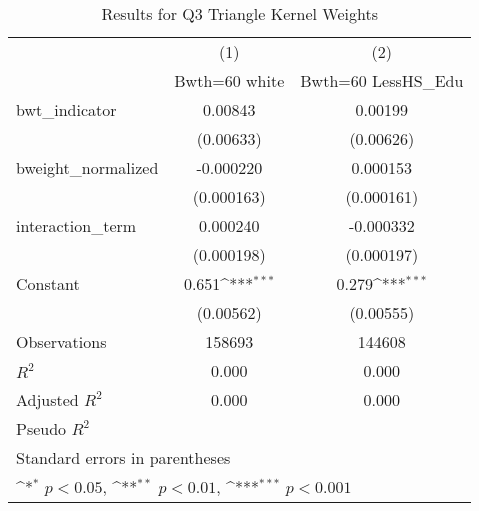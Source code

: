 \documentclass{article}
\begin{document}
\begin{table}[H]\centering
\def\sym#1{\ifmmode^{#1}\else\(^{#1}\)\fi}
\caption{Results for Q3 Triangle Kernel Weights \label{q3tri}}
\begin{tabular}{l*{2}{c}}
\toprule
                    &\multicolumn{1}{c}{(1)}&\multicolumn{1}{c}{(2)}\\
                    &\multicolumn{1}{c}{Bwth=60 white}&\multicolumn{1}{c}{Bwth=60 LessHS\_Edu}\\
\midrule
bwt\_indicator       &     0.00843         &     0.00199         \\
                    &   (0.00633)         &   (0.00626)         \\
\addlinespace
bweight\_normalized  &   -0.000220         &    0.000153         \\
                    &  (0.000163)         &  (0.000161)         \\
\addlinespace
interaction\_term    &    0.000240         &   -0.000332         \\
                    &  (0.000198)         &  (0.000197)         \\
\addlinespace
Constant            &       0.651\sym{***}&       0.279\sym{***}\\
                    &   (0.00562)         &   (0.00555)         \\
\midrule
Observations        &      158693         &      144608         \\
\(R^{2}\)           &       0.000         &       0.000         \\
Adjusted \(R^{2}\)  &       0.000         &       0.000         \\
Pseudo \(R^{2}\)    &                     &                     \\
\bottomrule
\multicolumn{3}{l}{\footnotesize Standard errors in parentheses}\\
\multicolumn{3}{l}{\footnotesize \sym{*} \(p<0.05\), \sym{**} \(p<0.01\), \sym{***} \(p<0.001\)}\\
\end{tabular}
\end{table}
\end{document}
